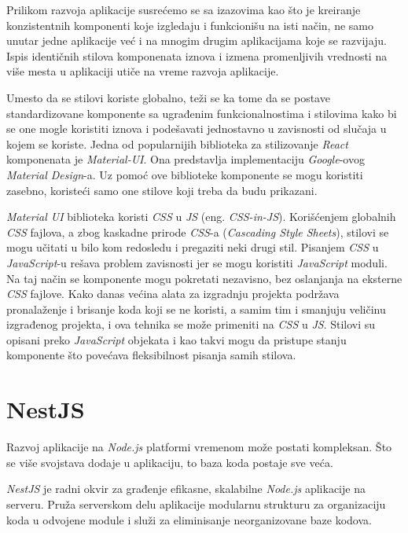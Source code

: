 Prilikom razvoja aplikacije susrećemo se sa izazovima kao što je kreiranje konzistentnih komponenti koje izgledaju i funkcionišu 
na isti način, ne samo unutar jedne aplikacije već i na mnogim drugim aplikacijama koje se razvijaju. Ispis identičnih stilova 
komponenata iznova i izmena promenljivih vrednosti na više mesta u aplikaciji utiče na vreme razvoja aplikacije.

Umesto da se stilovi koriste globalno, teži se ka tome da se postave standardizovane komponente sa ugrađenim funkcionalnostima i 
stilovima kako bi se one mogle koristiti iznova i podešavati jednostavno u zavisnosti od slučaja u kojem se koriste.
Jedna od popularnijih biblioteka za stilizovanje \textit{React} komponenata je \textit{Material-UI}. Ona predstavlja 
implementaciju \textit{Google}-ovog \textit{Material Design}-a. Uz pomoć ove biblioteke komponente se mogu koristiti zasebno, 
koristeći samo one stilove koji treba da budu prikazani.

\textit{Material UI} biblioteka koristi \textit{CSS} u \textit{JS} (eng. \textit{CSS-in-JS}). Korišćenjem globalnih \textit{CSS} 
fajlova, a zbog kaskadne prirode \textit{CSS}-a (\textit{Cascading Style Sheets}), stilovi se mogu učitati u bilo kom redosledu 
i pregaziti neki drugi stil. Pisanjem \textit{CSS} u \textit{JavaScript}-u rešava problem zavisnosti jer se mogu koristiti 
\textit{JavaScript} moduli. Na taj način se komponente mogu pokretati nezavisno, bez oslanjanja na eksterne \textit{CSS} fajlove. 
Kako danas većina alata za izgradnju projekta podržava pronalaženje i brisanje koda koji se ne koristi, a samim tim i smanjuju 
veličinu izgrađenog projekta, i ova tehnika se može primeniti na \textit{CSS} u \textit{JS}. Stilovi su opisani preko 
\textit{JavaScript} objekata i kao takvi mogu da pristupe stanju komponente što povećava fleksibilnost pisanja samih stilova.


\section{NestJS}\label{sec:nestjs}
Razvoj aplikacije na \textit{Node.js} platformi vremenom može postati kompleksan. Što se više svojstava 
dodaje u aplikaciju, to baza koda postaje sve veća.

\textit{NestJS} je radni okvir za građenje efikasne, skalabilne \textit{Node.js} aplikacije na serveru. 
Pruža serverskom delu aplikacije modularnu strukturu za organizaciju koda u odvojene module i služi 
za eliminisanje neorganizovane baze kodova.

